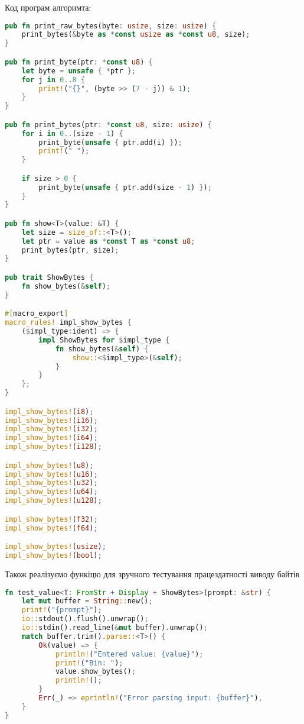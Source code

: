\noindent
Код програм алгоримта:
\begin{lstlisting}[language=Rust, style=colouredRust]
pub fn print_raw_bytes(byte: usize, size: usize) {
    print_bytes(&byte as *const usize as *const u8, size);
}

pub fn print_byte(ptr: *const u8) {
    let byte = unsafe { *ptr };
    for j in 0..8 {
        print!("{}", (byte >> (7 - j)) & 1);
    }
}

pub fn print_bytes(ptr: *const u8, size: usize) {
    for i in 0..(size - 1) {
        print_byte(unsafe { ptr.add(i) });
        print!(" ");
    }

    if size > 0 {
        print_byte(unsafe { ptr.add(size - 1) });
    }
}

pub fn show<T>(value: &T) {
    let size = size_of::<T>();
    let ptr = value as *const T as *const u8;
    print_bytes(ptr, size);
}

pub trait ShowBytes {
    fn show_bytes(&self);
}

#[macro_export]
macro_rules! impl_show_bytes {
    ($impl_type:ident) => {
        impl ShowBytes for $impl_type {
            fn show_bytes(&self) {
                show::<$impl_type>(&self);
            }
        }
    };
}

impl_show_bytes!(i8);
impl_show_bytes!(i16);
impl_show_bytes!(i32);
impl_show_bytes!(i64);
impl_show_bytes!(i128);

impl_show_bytes!(u8);
impl_show_bytes!(u16);
impl_show_bytes!(u32);
impl_show_bytes!(u64);
impl_show_bytes!(u128);

impl_show_bytes!(f32);
impl_show_bytes!(f64);

impl_show_bytes!(usize);
impl_show_bytes!(bool);
\end{lstlisting}

\noindent
Також реалізуємо функіцю для зручного тестування працездатності виводу байтів
\begin{lstlisting}[language=Rust, style=colouredRust]
fn test_value<T: FromStr + Display + ShowBytes>(prompt: &str) {
    let mut buffer = String::new();
    print!("{prompt}");
    io::stdout().flush().unwrap();
    io::stdin().read_line(&mut buffer).unwrap();
    match buffer.trim().parse::<T>() {
        Ok(value) => {
            println!("Entered value: {value}");
            print!("Bin: ");
            value.show_bytes();
            println!();
        }
        Err(_) => eprintln!("Error parsing input: {buffer}"),
    }
}
\end{lstlisting}



